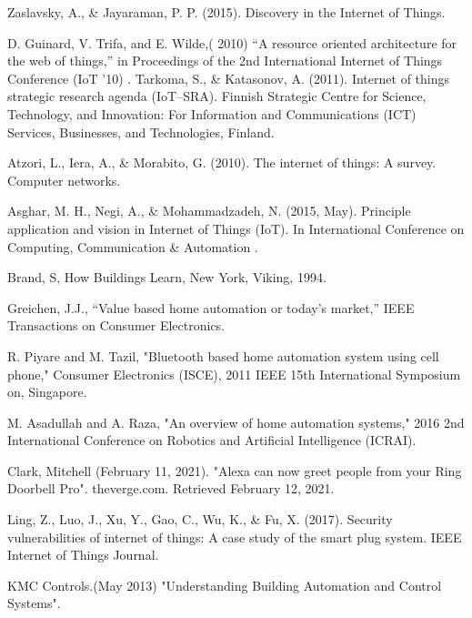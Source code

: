 \documentclass[conference]{IEEEtran}
\begin{document}
\begin{thebibliography}{00}
	
Zaslavsky, A., \& Jayaraman, P. P. (2015). Discovery in the Internet of Things. 
 
 D. Guinard, V. Trifa, and E. Wilde,( 2010) “A resource oriented architecture for the web of things,” in Proceedings of the 2nd International Internet of Things Conference (IoT ’10)
.
 Tarkoma, S., \& Katasonov, A. (2011). Internet of things strategic research agenda (IoT–SRA). Finnish Strategic Centre for Science, Technology, and Innovation: For Information and Communications (ICT) Services, Businesses, and Technologies, Finland.
 
 Atzori, L., Iera, A., \& Morabito, G. (2010). The internet of things: A survey. Computer networks.
 
 Asghar, M. H., Negi, A., \& Mohammadzadeh, N. (2015, May). Principle application and vision in Internet of Things (IoT). In International Conference on Computing, Communication \& Automation .
 
 Brand, S, How Buildings Learn, New York, Viking, 1994. 
 
 Greichen, J.J., “Value based home automation or today's market,” IEEE Transactions on Consumer Electronics.
 
 R. Piyare and M. Tazil, "Bluetooth based home automation system using cell phone," Consumer Electronics (ISCE), 2011 IEEE 15th
International Symposium on, Singapore.

 M. Asadullah and A. Raza, "An overview of home automation systems," 2016 2nd International Conference on Robotics and Artificial Intelligence (ICRAI).

 Clark, Mitchell (February 11, 2021). "Alexa can now greet people from your Ring Doorbell Pro". theverge.com. Retrieved February 12, 2021.

Ling, Z., Luo, J., Xu, Y., Gao, C., Wu, K., \& Fu, X. (2017). Security vulnerabilities of internet of things: A case study of the smart plug system. IEEE Internet of Things Journal.

KMC Controls.(May 2013) "Understanding Building Automation and Control Systems". 

\end{thebibliography}
\end{document}
